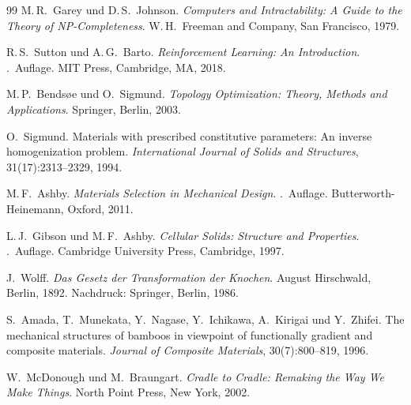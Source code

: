 ﻿\documentclass[a4paper,12pt]{article}
\theoremstyle{definition}
\begin{document}
\begin{thebibliography}{99}
M.\,R.~Garey und D.\,S.~Johnson.
\newblock \emph{Computers and Intractability: A Guide to the Theory of
  NP-Completeness}.
\newblock W.\,H.\ Freeman and Company, San Francisco, 1979.

R.\,S.~Sutton und A.\,G.~Barto.
\newblock \emph{Reinforcement Learning: An Introduction}.
.\ Auflage. MIT Press, Cambridge, MA, 2018.


M.\,P.~Bends\o{}e und O.~Sigmund.
\newblock \emph{Topology Optimization: Theory, Methods and Applications}.
\newblock Springer, Berlin, 2003.

O.~Sigmund.
\newblock Materials with prescribed constitutive parameters: An inverse
  homogenization problem.
\newblock \emph{International Journal of Solids and Structures},
  31(17):2313--2329, 1994.


M.\,F.~Ashby.
\newblock \emph{Materials Selection in Mechanical Design}.
.\ Auflage. Butterworth-Heinemann, Oxford, 2011.

L.\,J.~Gibson und M.\,F.~Ashby.
\newblock \emph{Cellular Solids: Structure and Properties}.
.\ Auflage. Cambridge University Press, Cambridge, 1997.

J.~Wolff.
\newblock \emph{Das Gesetz der Transformation der Knochen}.
\newblock August Hirschwald, Berlin, 1892.
\newblock Nachdruck: Springer, Berlin, 1986.

S.~Amada, T.~Munekata, Y.~Nagase, Y.~Ichikawa, A.~Kirigai und Y.~Zhifei.
\newblock The mechanical structures of bamboos in viewpoint of functionally
  gradient and composite materials.
\newblock \emph{Journal of Composite Materials}, 30(7):800--819, 1996.


W.~McDonough und M.~Braungart.
\newblock \emph{Cradle to Cradle: Remaking the Way We Make Things}.
\newblock North Point Press, New York, 2002.

\end{thebibliography}
\end{document}
